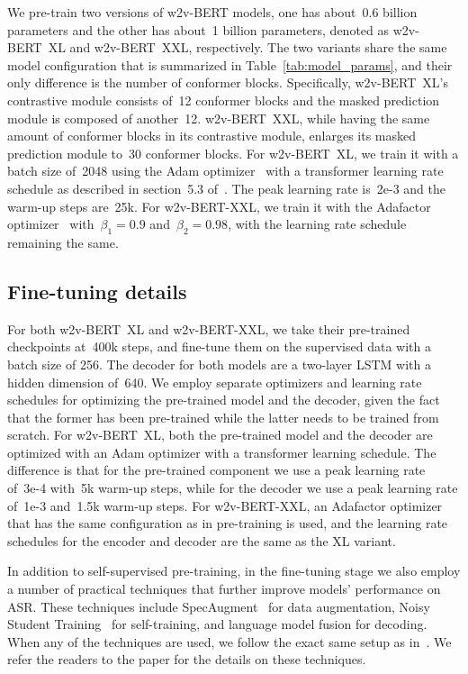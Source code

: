 \documentclass{article}
\begin{document}
 We pre-train two versions of w2v-BERT models, one has about~0.6 billion parameters and the other has about~1 billion parameters, denoted as w2v-BERT~XL and w2v-BERT~XXL, respectively.
The two variants share the same model configuration that is summarized in Table~\ref{tab:model_params}, and their only difference is the number of conformer blocks.
Specifically, w2v-BERT~XL's contrastive module consists of~12 conformer blocks and the masked prediction module is composed of another~12.
w2v-BERT~XXL, while having the same amount of conformer blocks in its contrastive module, enlarges its masked prediction module to~30 conformer blocks.
For w2v-BERT~XL, we train it with a batch size of~2048 using the Adam optimizer~\cite{kingma2015adam} with a transformer learning rate schedule as described in section~5.3 of~\cite{vaswani2017attention}.
The peak learning rate is~2e-3 and the warm-up steps are~25k.
For w2v-BERT-XXL, we train it with the Adafactor optimizer~\cite{shazeer2018adafactor} with~$\beta_{1} = 0.9$ and~$\beta_{2} = 0.98$, with the learning rate schedule remaining the same.

\subsection{Fine-tuning details}
 For both w2v-BERT~XL and w2v-BERT-XXL, we take their pre-trained checkpoints at~400k steps, and fine-tune them on the supervised data with a batch size of 256.
The decoder for both models are a two-layer LSTM with a hidden dimension of~640.
We employ separate optimizers and learning rate schedules for optimizing the pre-trained model and the decoder, given the fact that the former has been pre-trained while the latter needs to be trained from scratch.
For w2v-BERT~XL, both the pre-trained model and the decoder are optimized with an Adam optimizer with a transformer learning schedule.
The difference is that for the pre-trained component we use a peak learning rate of~3e-4 with~5k warm-up steps, while for the decoder we use a peak learning rate of~1e-3 and~1.5k warm-up steps.
For w2v-BERT-XXL, an Adafactor optimizer that has the same configuration as in pre-training is used, and the learning rate schedules for the encoder and decoder are the same as the XL variant.


In addition to self-supervised pre-training, in the fine-tuning stage we also employ a number of practical techniques that further improve models' performance on ASR.
These techniques include SpecAugment~\cite{park2019specaugment,park2020specaugment} for data augmentation, Noisy Student Training~\cite{park2020improved} for self-training, and language model fusion for decoding.
When any of the techniques are used, we follow the exact same setup as in~\cite{zhang2020pushing}.
We refer the readers to the paper for the details on these techniques.
\end{document}

